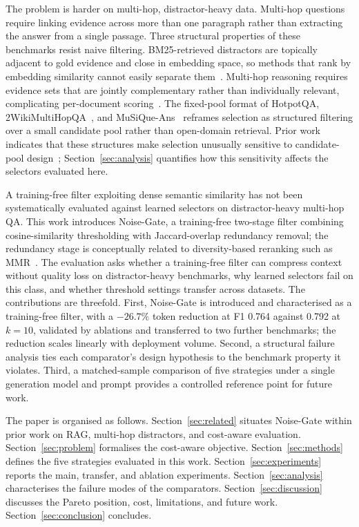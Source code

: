 \documentclass[runningheads]{llncs}
\begin{document}
The problem is harder on multi-hop, distractor-heavy data. Multi-hop questions require linking evidence across more than one paragraph rather than extracting the answer from a single passage. Three structural properties of these benchmarks resist naive filtering. BM25-retrieved distractors are topically adjacent to gold evidence and close in embedding space, so methods that rank by embedding similarity cannot easily separate them~\cite{chiang2024plausible}. Multi-hop reasoning requires evidence sets that are jointly complementary rather than individually relevant, complicating per-document scoring~\cite{trivedi2023interleave}. The fixed-pool format of HotpotQA, 2WikiMultiHopQA~\cite{ho-etal-2020-constructing}, and MuSiQue-Ans~\cite{trivedi-etal-2022-musique} reframes selection as structured filtering over a small candidate pool rather than open-domain retrieval. Prior work indicates that these structures make selection unusually sensitive to candidate-pool design~\cite{yang2018hotpotqa,chiang2024plausible,trivedi2023interleave,ho-etal-2020-constructing,trivedi-etal-2022-musique}; Section~\ref{sec:analysis} quantifies how this sensitivity affects the selectors evaluated here.

A training-free filter exploiting dense semantic similarity has not been systematically evaluated against learned selectors on distractor-heavy multi-hop QA. This work introduces Noise-Gate, a training-free two-stage filter combining cosine-similarity thresholding with Jaccard-overlap redundancy removal; the redundancy stage is conceptually related to diversity-based reranking such as MMR~\cite{goldstein1998mmr}. The evaluation asks whether a training-free filter can compress context without quality loss on distractor-heavy benchmarks, why learned selectors fail on this class, and whether threshold settings transfer across datasets. The contributions are threefold. First, Noise-Gate is introduced and characterised as a training-free filter, with a $-26.7\%$ token reduction at F1 0.764 against 0.792 at $k{=}10$, validated by ablations and transferred to two further benchmarks; the reduction scales linearly with deployment volume. Second, a structural failure analysis ties each comparator's design hypothesis to the benchmark property it violates. Third, a matched-sample comparison of five strategies under a single generation model and prompt provides a controlled reference point for future work.

The paper is organised as follows. Section~\ref{sec:related} situates Noise-Gate within prior work on RAG, multi-hop distractors, and cost-aware evaluation. Section~\ref{sec:problem} formalises the cost-aware objective. Section~\ref{sec:methods} defines the five strategies evaluated in this work. Section~\ref{sec:experiments} reports the main, transfer, and ablation experiments. Section~\ref{sec:analysis} characterises the failure modes of the comparators. Section~\ref{sec:discussion} discusses the Pareto position, cost, limitations, and future work. Section~\ref{sec:conclusion} concludes.
\end{document}
